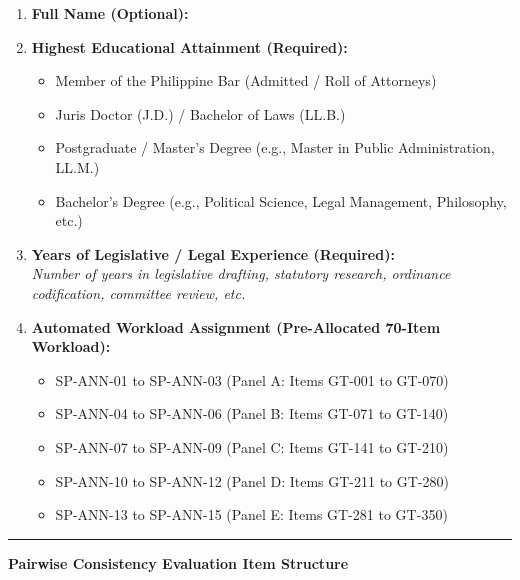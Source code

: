 \begin{enumerate}[leftmargin=1.8em, itemsep=5pt]
    \item \textbf{Full Name (Optional):} \underline{\hspace{8.5cm}}
    \item \textbf{Highest Educational Attainment (Required):}
    \begin{itemize}[leftmargin=1.5em, itemsep=2pt]
        \item[$\bigcirc$] Member of the Philippine Bar (Admitted / Roll of Attorneys)
        \item[$\bigcirc$] Juris Doctor (J.D.) / Bachelor of Laws (LL.B.)
        \item[$\bigcirc$] Postgraduate / Master's Degree (e.g., Master in Public Administration, LL.M.)
        \item[$\bigcirc$] Bachelor's Degree (e.g., Political Science, Legal Management, Philosophy, etc.)
    \end{itemize}
    \item \textbf{Years of Legislative / Legal Experience (Required):} \underline{\hspace{4.5cm}}\\
    \small\textit{Number of years in legislative drafting, statutory research, ordinance codification, committee review, etc.}
    \item \textbf{Automated Workload Assignment (Pre-Allocated 70-Item Workload):}
    \begin{itemize}[leftmargin=1.5em, itemsep=2pt]
        \item[$\bigcirc$] SP-ANN-01 to SP-ANN-03 (Panel A: Items GT-001 to GT-070)
        \item[$\bigcirc$] SP-ANN-04 to SP-ANN-06 (Panel B: Items GT-071 to GT-140)
        \item[$\bigcirc$] SP-ANN-07 to SP-ANN-09 (Panel C: Items GT-141 to GT-210)
        \item[$\bigcirc$] SP-ANN-10 to SP-ANN-12 (Panel D: Items GT-211 to GT-280)
        \item[$\bigcirc$] SP-ANN-13 to SP-ANN-15 (Panel E: Items GT-281 to GT-350)
    \end{itemize}
\end{enumerate}

\vspace{1em}
\hrule
\vspace{1em}

\noindent\textbf{Pairwise Consistency Evaluation Item Structure}

